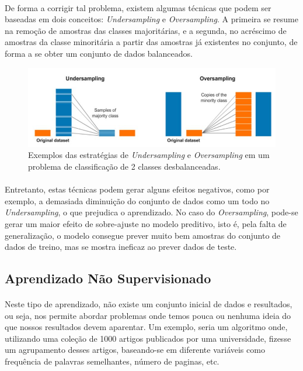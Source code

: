 \documentclass[grad,numbers]{coppe}
\begin{document}
  			\paragraph{}De forma a corrigir tal problema, existem algumas técnicas que podem ser baseadas em dois conceitos: \textit{Undersampling} e \textit{Oversampling}. A primeira se resume na remoção de amostras das classes majoritárias, e a segunda, no acréscimo de amostras da classe minoritária a partir das amostras já existentes no conjunto, de forma a se obter um conjunto de dados balanceados.
				\newpage
  			\begin{figure}[h]
  				\centering
  				\includegraphics[width=13cm]{os_and_us.jpg}
  				\caption{Exemplos das estratégias de \textit{Undersampling} e \textit{Oversampling} em um problema de classificação de 2 classes desbalanceadas\cite{os_and_us}.}
  				\label{fig:os_and_us}
  			\end{figure}
  			\paragraph{}Entretanto, estas técnicas podem gerar alguns efeitos negativos, como por exemplo, a demasiada diminuição do conjunto de dados como um todo no \textit{Undersampling}, o que prejudica o aprendizado. No caso do \textit{Oversampling}, pode-se gerar um maior efeito de sobre-ajuste no modelo preditivo, isto é, pela falta de generalização, o modelo consegue prever muito bem amostras do conjunto de dados de treino, mas se mostra ineficaz ao prever dados de teste.
		\subsection{Aprendizado Não Supervisionado}
			\paragraph{}Neste tipo de aprendizado, não existe um conjunto inicial de dados e resultados, ou seja, nos permite abordar problemas onde temos pouca ou nenhuma ideia do que nossos resultados devem aparentar. Um exemplo, seria um algoritmo onde, utilizando uma coleção de 1000 artigos publicados por uma universidade, fizesse um agrupamento desses artigos, baseando-se em diferente variáveis como frequência de palavras semelhantes, número de paginas, etc.
\end{document}

